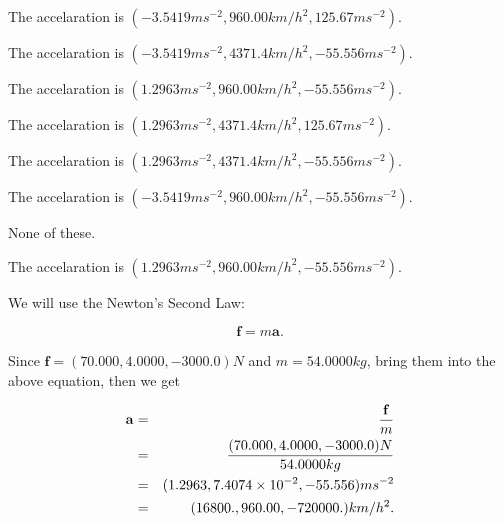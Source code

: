 \documentclass[12pt]{article}
\begin{document}
 
 
The accelaration is
$(
-3.5419ms^{-2},
960.00km/h^2,
125.67ms^{-2}
).
$
 
 
The accelaration is
$(
-3.5419ms^{-2},
4371.4km/h^2,
-55.556ms^{-2}
).
$
 
 
The accelaration is
$(
1.2963ms^{-2},
960.00km/h^2,
-55.556ms^{-2}
).
$
 
 
The accelaration is
$(
1.2963ms^{-2},
4371.4km/h^2,
125.67ms^{-2}
).
$
 
 
The accelaration is
$(
1.2963ms^{-2},
4371.4km/h^2,
-55.556ms^{-2}
).
$
 
 
The accelaration is
$(
-3.5419ms^{-2},
960.00km/h^2,
-55.556ms^{-2}
).
$
 
 
 None of these.
 
 
\noindent{}
 
 
The accelaration is
$(
1.2963ms^{-2},
960.00km/h^2,
-55.556ms^{-2}
).
$
 
 
\noindent{}
 
 
 
 
 
 
\noindent{}
 
 

We will use the Newton's Second Law:
 
\[
\mathbf{f}=m\mathbf{a}.
\]
 
Since $\mathbf{f}=( %
70.000,  %
4.0000,  %
-3000.0 )N$
and $m= %
54.0000kg$, bring them into the above equation, then we get
 
\begin{eqnarray*}
\mathbf{a}&=&\frac{\mathbf{f}}m  \\
&=&\frac{(
70.000 ,
4.0000 ,
-3000.0 )N
}{ %
54.0000 kg}  \\
&=&(
1.2963 ,
7.4074 \times 10^{-2},
-55.556
)ms^{-2} \\
&=&(
16800. ,
960.00 ,
-720000.
)km/h^2.
\end{eqnarray*}
 
 
 
\noindent{}
 
\end{document}
